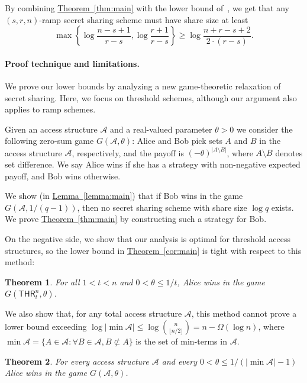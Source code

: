 \documentclass[11pt]{article}
\numberwithin{equation}{section}
\newtheorem{theorem}{Theorem}[section]
\theoremstyle{definition}
\theoremstyle{plain}
\newcommand{\expref}[2]{\hyperref[#2]{#1~\ref{#2}}}
\newcommand{\thr}[2]{\mathsf{THR}_{#1}^{#2}}
\def\calA{\mathcal{A}}
\providecommand\floor[1]{\lfloor#1\rfloor}
\providecommand\abs[1]{\lvert#1\rvert}
\begin{document}
By combining \expref{Theorem}{thm:main} with the lower bound of~\cite{PueyoCX13}, we
get that any $(s,r,n)$-ramp secret sharing scheme must have share size at least
\begin{equation}
\label{eqn:combined_ramp}
\max\left\{\log\frac{n-s+1}{r-s}, \log \frac{r + 1}{r - s}\right\} \geq \log
\frac{n+r-s+2}{2\cdot (r-s)}.
\end{equation}

%
\paragraph{Proof technique and limitations.}
We prove our lower bounds by analyzing a new game-theoretic relaxation of secret
sharing. Here, we focus on threshold schemes, although our argument also applies to
ramp schemes.

Given an access structure $\calA$ and a real-valued parameter $\theta > 0$ we consider the following zero-sum game $G(\mathcal{A}, \theta)$:  Alice and Bob pick sets $A$ and $B$ in the access structure $\mathcal{A}$, respectively, and the payoff is $(-\theta)^{\abs{A \setminus B}}$, where $A \setminus B$ denotes set difference.  We say Alice wins if she has a strategy with non-negative expected payoff, and Bob wins otherwise.

We show (in \expref{Lemma}{lemma:main}) that if Bob wins in the game $G(\calA, 1/(q-1))$, then no secret sharing scheme with share size $\log q$ exists.  We prove \expref{Theorem}{thm:main} by constructing such a strategy for Bob.

On the negative side, we show that our analysis is optimal for threshold access structures, so the lower bound in \expref{Theorem}{cor:main} is tight with respect to this method:

\begin{theorem}	\label{thm:limitation}
For all $1 < t < n$ and $0 < \theta \leq 1/t$,  Alice wins in the game $G(\thr{t}{n}, \theta)$.
\end{theorem}

We also show that, for any total access structure $\calA$, this method cannot prove a lower bound exceeding 
$\log\abs{\min\calA}\leq \log \binom{n}{\floor{n/2}} = n-\Omega(\log{n})$, 
where $\min\calA=\{A\in\calA:\forall B\in\calA, B\not\subset A\}$ is the set of min-terms in $\calA$. 

\begin{theorem}	\label{thm:limitation1}
For every access structure $\mathcal{A}$ and every 
$0 < \theta \leq 1/(\abs{\min\calA} - 1)$ 
Alice wins in the game $G(\mathcal{A}, \theta)$. 
\end{theorem}
\end{document}

